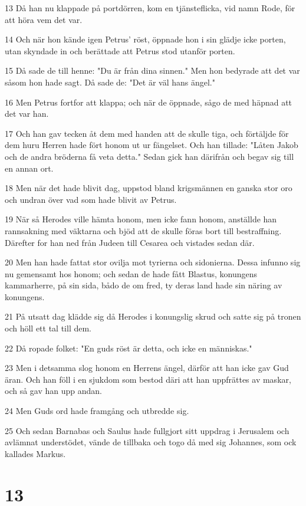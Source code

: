 \par 13 Då han nu klappade på portdörren, kom en tjänsteflicka, vid namn Rode, för att höra vem det var.
\par 14 Och när hon kände igen Petrus' röst, öppnade hon i sin glädje icke porten, utan skyndade in och berättade att Petrus stod utanför porten.
\par 15 Då sade de till henne: "Du är från dina sinnen." Men hon bedyrade att det var såsom hon hade sagt. Då sade de: "Det är väl hans ängel."
\par 16 Men Petrus fortfor att klappa; och när de öppnade, sågo de med häpnad att det var han.
\par 17 Och han gav tecken åt dem med handen att de skulle tiga, och förtäljde för dem huru Herren hade fört honom ut ur fängelset. Och han tillade: "Låten Jakob och de andra bröderna få veta detta." Sedan gick han därifrån och begav sig till en annan ort.
\par 18 Men när det hade blivit dag, uppstod bland krigsmännen en ganska stor oro och undran över vad som hade blivit av Petrus.
\par 19 När så Herodes ville hämta honom, men icke fann honom, anställde han rannsakning med väktarna och bjöd att de skulle föras bort till bestraffning. Därefter for han ned från Judeen till Cesarea och vistades sedan där.
\par 20 Men han hade fattat stor ovilja mot tyrierna och sidonierna. Dessa infunno sig nu gemensamt hos honom; och sedan de hade fått Blastus, konungens kammarherre, på sin sida, bådo de om fred, ty deras land hade sin näring av konungens.
\par 21 På utsatt dag klädde sig då Herodes i konungslig skrud och satte sig på tronen och höll ett tal till dem.
\par 22 Då ropade folket: "En guds röst är detta, och icke en människas."
\par 23 Men i detsamma slog honom en Herrens ängel, därför att han icke gav Gud äran. Och han föll i en sjukdom som bestod däri att han uppfrättes av maskar, och så gav han upp andan.
\par 24 Men Guds ord hade framgång och utbredde sig.
\par 25 Och sedan Barnabas och Saulus hade fullgjort sitt uppdrag i Jerusalem och avlämnat understödet, vände de tillbaka och togo då med sig Johannes, som ock kallades Markus.

\chapter{13}


